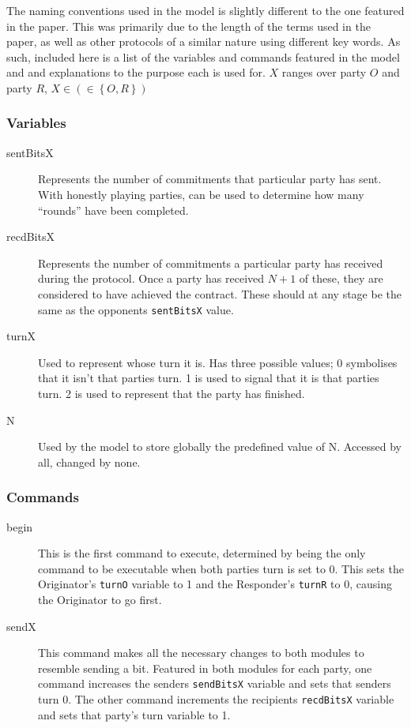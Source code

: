 \documentclass{l4proj}
\begin{document}
\begin{center}

\end{center}

The naming conventions used in the model is slightly different to the one featured in the paper. This was primarily due to the length of the terms used in the paper, as well as other protocols of a similar nature using different key words. As such, included here is a list of the variables and commands featured in the model and and explanations to the purpose each is used for. $X$ ranges over party $O$ and party $R$, $X \in \left ( \in \left \{ O,R \right \} \right )$

\subsubsection{Variables}
\begin{description}
\item[sentBitsX] Represents the number of commitments that particular party has sent. With honestly playing parties, can be used to determine how many ``rounds'' have been completed.
\item[recdBitsX] Represents the number of commitments a particular party has received during the protocol. Once a party has received $N+1$ of these, they are considered to have achieved the contract. These should at any stage be the same as the opponents {\tt sentBitsX} value.
\item[turnX] Used to represent whose turn it is. Has three possible values; 0 symbolises that it isn't that parties turn. 1 is used to signal that it is that parties turn. 2 is used to represent that the party has finished.
\item[N] Used by the model to store globally the predefined value of N. Accessed by all, changed by none.
\end{description}
\subsubsection{Commands}
\begin{description}
\item[begin] This is the first command to execute, determined by being the only command to be executable when both parties turn is set to 0. This sets the Originator's {\tt turnO} variable to 1 and the Responder's {\tt turnR} to 0, causing the Originator to go first. 
\item[sendX] This command makes all the necessary changes to both modules to resemble sending a bit. Featured in both modules for each party, one command increases the senders {\tt sendBitsX} variable and sets that senders turn 0. The other command increments the recipients {\tt recdBitsX} variable and sets that party's turn variable to 1.
\end{description}
\end{document}
